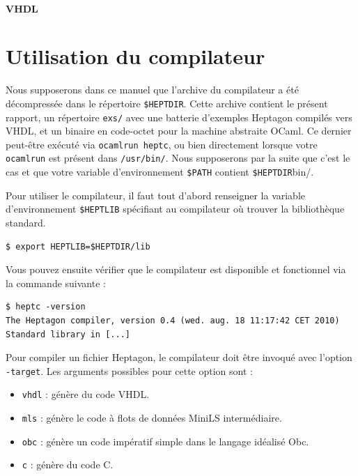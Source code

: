 \documentclass[9pt,a4paper]{article}
\newcommand{\LANG}{Heptagon}
\begin{document}
\paragraph{VHDL}

\small

\normalsize

\section{Utilisation du compilateur}

Nous supposerons dans ce manuel que l'archive du compilateur a été décompressée
dans le répertoire \verb/$HEPTDIR/. Cette archive contient le présent rapport,
un répertoire \texttt{exs/} avec une batterie d'exemples \LANG{} compilés vers
VHDL, et un binaire en code-octet pour la machine abstraite OCaml. Ce dernier
peut-être exécuté via \texttt{ocamlrun heptc}, ou bien directement lorsque votre
\texttt{ocamlrun} est présent dans \texttt{/usr/bin/}. Nous supposerons par la
suite que c'est le cas et que votre variable d'environnement \verb/$PATH/
contient \verb/$HEPTDIR/bin/.

Pour utiliser le compilateur, il faut tout d'abord renseigner la variable
d'environnement \verb/$HEPTLIB/ spécifiant au compilateur où trouver la
bibliothèque standard.

\begin{verbatim}
$ export HEPTLIB=$HEPTDIR/lib
\end{verbatim}

Vous pouvez ensuite vérifier que le compilateur est disponible et fonctionnel
via la commande suivante :

\begin{verbatim}
$ heptc -version
The Heptagon compiler, version 0.4 (wed. aug. 18 11:17:42 CET 2010)
Standard library in [...]
\end{verbatim}

Pour compiler un fichier \LANG{}, le compilateur doit être invoqué avec l'option
\verb/-target/. Les arguments possibles pour cette option sont :

\begin{itemize}
\item \verb/vhdl/ : génère du code VHDL.
\item \verb/mls/ : génère le code à flots de données MiniLS intermédiaire.
\item \verb/obc/ : génère un code impératif simple dans le langage idéalisé Obc.
\item \verb/c/ : génère du code C.
\end{itemize}
\end{document}
